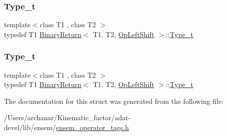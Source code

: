 \mbox{\label{structBinaryReturn_3_01T1_00_01T2_00_01OpLeftShift_01_4_a49e088c9b6e38646dc1ee380d7c79c39}} 
\subsubsection{\texorpdfstring{Type\_t}{Type\_t}\hspace{0.1cm}{\footnotesize\ttfamily [2/3]}}
{\footnotesize\ttfamily template$<$class T1 , class T2 $>$ \\
typedef T1 \mbox{\hyperlink{structBinaryReturn}{Binary\+Return}}$<$ T1, T2, \mbox{\hyperlink{structOpLeftShift}{Op\+Left\+Shift}} $>$\+::\mbox{\hyperlink{structBinaryReturn_3_01T1_00_01T2_00_01OpLeftShift_01_4_a49e088c9b6e38646dc1ee380d7c79c39}{Type\+\_\+t}}}

\mbox{\label{structBinaryReturn_3_01T1_00_01T2_00_01OpLeftShift_01_4_a49e088c9b6e38646dc1ee380d7c79c39}} 
\subsubsection{\texorpdfstring{Type\_t}{Type\_t}\hspace{0.1cm}{\footnotesize\ttfamily [3/3]}}
{\footnotesize\ttfamily template$<$class T1 , class T2 $>$ \\
typedef T1 \mbox{\hyperlink{structBinaryReturn}{Binary\+Return}}$<$ T1, T2, \mbox{\hyperlink{structOpLeftShift}{Op\+Left\+Shift}} $>$\+::\mbox{\hyperlink{structBinaryReturn_3_01T1_00_01T2_00_01OpLeftShift_01_4_a49e088c9b6e38646dc1ee380d7c79c39}{Type\+\_\+t}}}



The documentation for this struct was generated from the following file\+:\begin{DoxyCompactItemize}
\item 
/\+Users/archanar/\+Kinematic\+\_\+factor/adat-\/devel/lib/ensem/\mbox{\hyperlink{adat-devel_2lib_2ensem_2ensem__operator__tags_8h}{ensem\+\_\+operator\+\_\+tags.\+h}}\end{DoxyCompactItemize}
